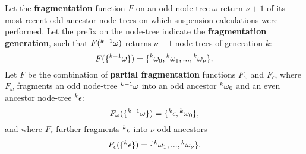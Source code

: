 
\begin{definition}\label{def:fragmentation}
  Let the \textbf{fragmentation} function $F$ on an odd node-tree $\omega$ return $\nu + 1$ of its most recent odd ancestor node-trees on which suspension calculations were performed. Let the prefix on the node-tree indicate the \textbf{fragmentation generation}, such that $F({}^{k-1}\omega)$ returns $\nu + 1$ node-trees of generation $k$:
  \begin{equation}\label{eq:fstep}
    F(\{\pre{k-1}\omega\}) = \{\pre{k}\omega_0,\pre{k}\omega_1,...,\pre{k}\omega_{\nu}\}.
  \end{equation}
  Let $F$ be the combination of \textbf{partial fragmentation} functions $F_\omega$ and $F_\epsilon$, where $F_\omega$ fragments an odd node-tree ${}^{k-1}\omega$ into an odd ancestor ${}^{k}\omega_0$ and an even ancestor node-tree ${}^{k}\epsilon$: 
  \begin{equation}\label{eq:pfo}
    F_\omega(\{\pre{k-1}\omega\}) = \{\pre{k}\epsilon, \pre{k}\omega_0 \},
  \end{equation}
  and where $F_\epsilon$ further fragments ${}^{k}\epsilon$ into $\nu$ odd ancestors
  \begin{equation}\label{eq:pfe}
    F_\epsilon(\{\pre{k}\epsilon\}) =\{\pre{k}\omega_1,...,\pre{k}\omega_{\nu}\}.
  \end{equation}

\end{definition}

